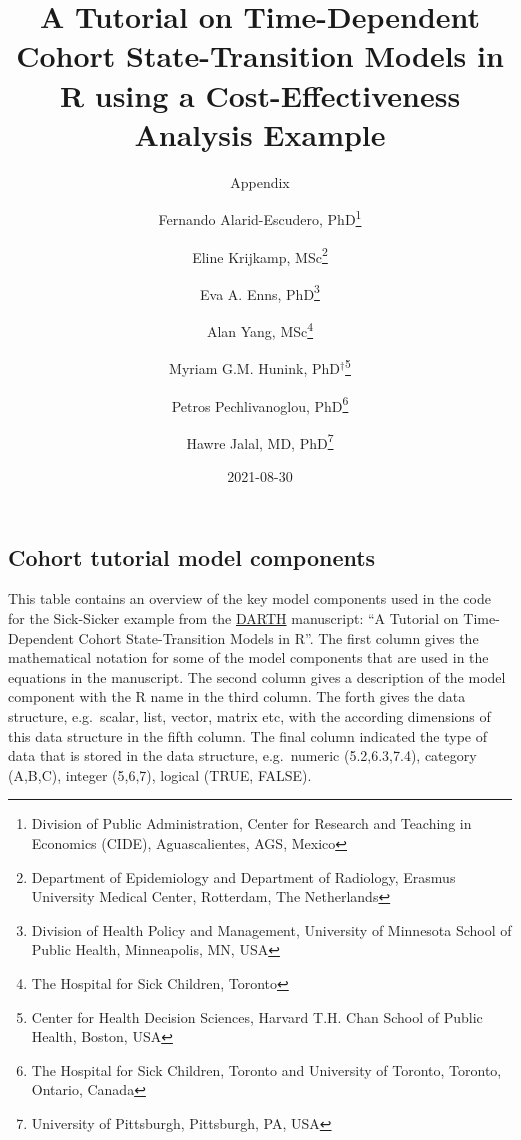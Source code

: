 \documentclass[
  landscape]{article}
\title{A Tutorial on Time-Dependent Cohort State-Transition Models in R
using a Cost-Effectiveness Analysis Example}
\subtitle{Appendix}
\author{Fernando Alarid-Escudero, PhD\footnote{Division of Public
  Administration, Center for Research and Teaching in Economics (CIDE),
  Aguascalientes, AGS, Mexico} \and Eline Krijkamp,
MSc\footnote{Department of Epidemiology and Department of Radiology,
  Erasmus University Medical Center, Rotterdam, The Netherlands} \and Eva
A. Enns, PhD\footnote{Division of Health Policy and Management,
  University of Minnesota School of Public Health, Minneapolis, MN, USA} \and Alan
Yang, MSc\footnote{The Hospital for Sick Children, Toronto} \and Myriam
G.M. Hunink, PhD\(^\dagger\)\footnote{Center for Health Decision
  Sciences, Harvard T.H. Chan School of Public Health, Boston, USA} \and Petros
Pechlivanoglou, PhD\footnote{The Hospital for Sick Children, Toronto and
  University of Toronto, Toronto, Ontario, Canada} \and Hawre Jalal, MD,
PhD\footnote{University of Pittsburgh, Pittsburgh, PA, USA}}
\date{2021-08-30}
\begin{document}
\maketitle

\hypertarget{cohort-tutorial-model-components}{%
\subsection{Cohort tutorial model
components}\label{cohort-tutorial-model-components}}

This table contains an overview of the key model components used in the
code for the Sick-Sicker example from the
\href{http://darthworkgroup.com/publications/}{DARTH} manuscript: ``A
Tutorial on Time-Dependent Cohort State-Transition Models in R''. The
first column gives the mathematical notation for some of the model
components that are used in the equations in the manuscript. The second
column gives a description of the model component with the R name in the
third column. The forth gives the data structure, e.g.~scalar, list,
vector, matrix etc, with the according dimensions of this data structure
in the fifth column. The final column indicated the type of data that is
stored in the data structure, e.g.~numeric (5.2,6.3,7.4), category
(A,B,C), integer (5,6,7), logical (TRUE, FALSE).
\end{document}
